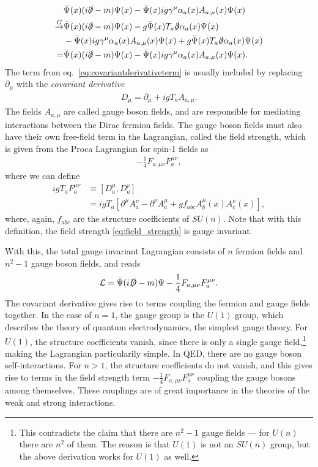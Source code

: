 \documentclass[twoside,english]{uiofysmaster}
\begin{document}
\begin{align}
	&\bar\Psi(x)(i\slashed\partial - m)\Psi(x) - \bar\Psi(x) ig\gamma^\mu \alpha_a(x)A_{a,\mu}(x) \Psi(x)\nonumber\\
	\overset{G}{\to} &\bar\Psi(x)(i\slashed\partial - m)\Psi(x) - g\bar\Psi(x) T_a\slashed\partial \alpha_a(x) \Psi(x)\\
	 &- \bar\Psi(x) ig\gamma^\mu \alpha_a(x)A_{a,\mu}(x) \Psi(x) +  g\bar\Psi(x) T_a\slashed\partial \alpha_a(x) \Psi(x)\nonumber\\
	 = &\bar\Psi(x)(i\slashed\partial - m)\Psi(x) - \bar\Psi(x) ig\gamma^\mu \alpha_a(x)A_{a,\mu}(x) \Psi(x).\nonumber
\end{align}
The term from eq.\ \eqref{eq:covariantderivativeterm} is usually included by replacing $\partial_\mu$ with the {\it covariant derivative}
\begin{align}
	D_\mu = \partial_\mu + igT_a A_{a,\mu}.
\end{align}
The fields $A_{a,\mu}$ are called gauge boson fields, and are responsible for mediating interactions between the Dirac fermion fields. The gauge boson fields must also have their own free-field term in the Lagrangian, called the field strength, which is given from the Proca Lagrangian for spin-1 fields as 
\begin{align}
	-\frac{1}{4} F_{a,\mu\nu} F_a^{\mu\nu},\label{eq:field_strength}
\end{align}
where we can define
\begin{align}
	igT_a F_{a}^{\mu\nu} &\equiv [D_a^\mu, D_a^\nu] \\
	&= igT_a \left[ \partial^\mu A_a^\nu - \partial^\nu A_a^\mu + g f_{abc} A_b^{\mu}(x)A_c^{\nu}(x) \right],
\end{align}
where, again, $f_{abc}$ are the structure coefficients of $SU(n)$. Note that with this definition, the field strength \eqref{eq:field_strength} is gauge invariant.

With this, the total gauge invariant Lagrangian consists of $n$ fermion fields and $n^2-1$ gauge boson fields, and reads
\begin{align}
	\mathcal{L} = \bar\Psi(i\slashed D - m)\Psi - \frac{1}{4} F_{a,\mu\nu} F_a^{\mu\nu}.
\end{align}
The covariant derivative gives rise to terms coupling the fermion and gauge fields together. In the case of $n=1$, the gauge group is the $U(1)$ group, which describes the theory of quantum electrodynamics, the simplest gauge theory. For $U(1)$, the structure coefficients vanish, since there is only a single gauge field,\footnote{This contradicts the claim that there are $n^2-1$ gauge fields --- for $U(n)$ there are $n^2$ of them. The reason is that $U(1)$ is not an $SU(n)$ group, but the above derivation works for $U(1)$ as well.} making the Lagrangian particularily simple. In QED, there are no gauge boson self-interactions. For $n>1$, the structure coefficients do not vanish, and this gives rise to terms in the field strength term $-\frac{1}{4} F_{a,\mu\nu} F_a^{\mu\nu}$ coupling the gauge bosons among themselves. These couplings are of great importance in the theories of the weak and strong interactions.
\end{document}
